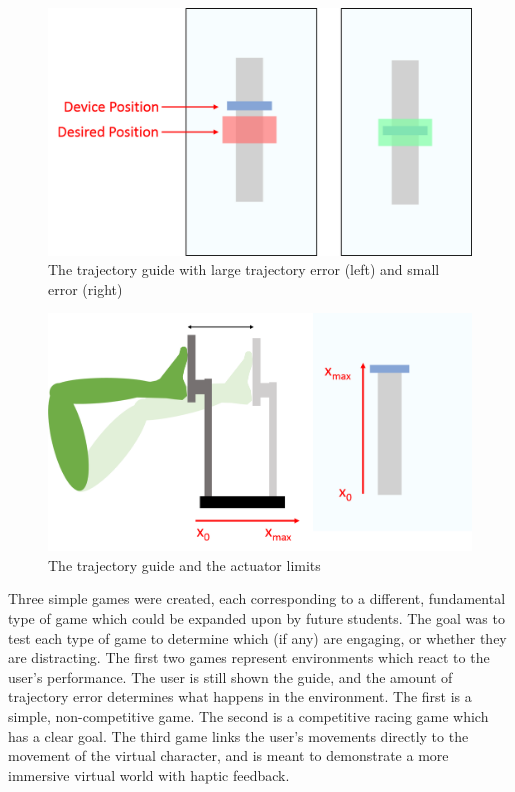 \documentclass[12pt]{report}
\begin{document}
	\begin{figure}[h] 
		\centering
		\includegraphics[width=0.75\linewidth]{UI_trajectory}
		\caption{The trajectory guide with large trajectory error (left) and small error (right)}
		\label{fig:trajectory}
	\end{figure} 
	
	\begin{figure}[h] 
		\centering
		\includegraphics[width=\linewidth]{axis_leg}
		\caption{The trajectory guide and the actuator limits}
		\label{fig:axis_leg}
	\end{figure} 
	

	
	Three simple games were created, each corresponding to a different, fundamental type of game which could be expanded upon by future students. The goal was to test each type of game to determine which (if any) are engaging, or whether they are distracting. The first two games represent environments which react to the user's performance. The user is still shown the guide, and the amount of trajectory error determines what happens in the environment. The first is a simple, non-competitive game. The second is a competitive racing game which has a clear goal. The third game links the user's movements directly to the movement of the virtual character, and is meant to demonstrate a more immersive virtual world with haptic feedback. 
	
\end{document}
